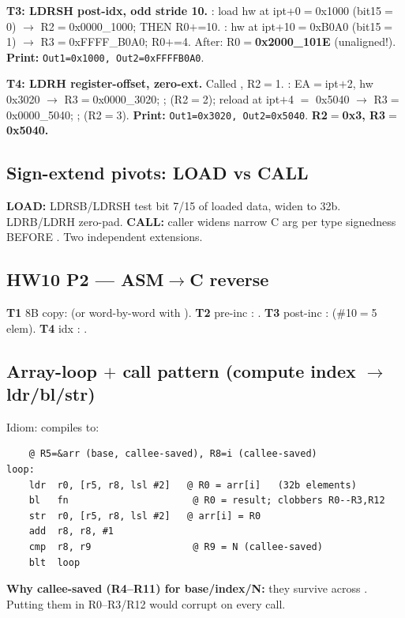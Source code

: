 \textbf{T3: LDRSH post-idx, odd stride 10.}
: load hw at ipt+0$=$0x1000 (bit15$=$0) $\to$
R2$=$0x0000\_1000; THEN R0$+$=10.
: hw at ipt+10$=$0xB0A0 (bit15$=$1) $\to$
R3$=$0xFFFF\_B0A0; R0$+$=4.
After: R0$=$\textbf{0x2000\_101E} (unaligned!).
\textbf{Print:} \texttt{Out1=0x1000, Out2=0xFFFFB0A0}.

\textbf{T4: LDRH register-offset, zero-ext.} Called , R2$=$1.
: EA$=$ipt$+$2, hw 0x3020 $\to$ R3$=$0x0000\_3020;
;  (R2$=$2); reload at ipt$+$4 $=$
0x5040 $\to$ R3$=$0x0000\_5040; ;  (R2$=$3).
\textbf{Print:} \texttt{Out1=0x3020, Out2=0x5040}. \textbf{R2$=$0x3, R3$=$0x5040.}

\subsection{Sign-extend pivots: LOAD vs CALL}
\textbf{LOAD:} LDRSB/LDRSH test bit 7/15 of loaded data, widen to 32b. LDRB/LDRH zero-pad.
\textbf{CALL:} caller widens narrow C arg per type signedness BEFORE . Two independent extensions.

\subsection{HW10 P2 --- ASM$\to$C reverse}
\textbf{T1} 8B copy:  (or word-by-word with ).
\textbf{T2} pre-inc : .
\textbf{T3} post-inc :  (\#10$=$5 elem).
\textbf{T4} idx : .

\subsection{Array-loop $+$ call pattern (compute index $\to$ ldr/bl/str)}
Idiom:  compiles to:
\begin{lstlisting}
    @ R5=&arr (base, callee-saved), R8=i (callee-saved)
loop:
    ldr  r0, [r5, r8, lsl #2]   @ R0 = arr[i]   (32b elements)
    bl   fn                      @ R0 = result; clobbers R0--R3,R12
    str  r0, [r5, r8, lsl #2]   @ arr[i] = R0
    add  r8, r8, #1
    cmp  r8, r9                  @ R9 = N (callee-saved)
    blt  loop
\end{lstlisting}
\textbf{Why callee-saved (R4--R11) for base/index/N:} they survive across
. Putting them in R0--R3/R12 would corrupt on every call.


